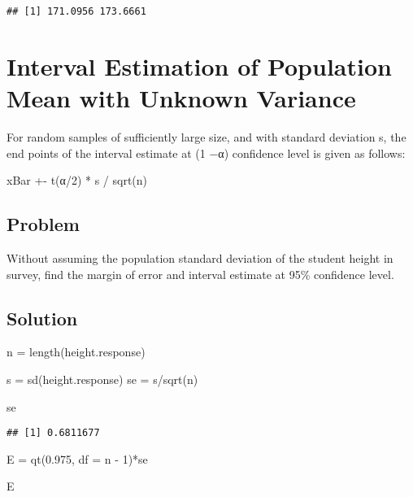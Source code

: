 \documentclass[
]{article}
\newenvironment{Shaded}{\begin{snugshade}}{\end{snugshade}}
\newcommand{\AttributeTok}[1]{\textcolor[rgb]{0.77,0.63,0.00}{#1}}
\newcommand{\DecValTok}[1]{\textcolor[rgb]{0.00,0.00,0.81}{#1}}
\newcommand{\FloatTok}[1]{\textcolor[rgb]{0.00,0.00,0.81}{#1}}
\newcommand{\FunctionTok}[1]{\textcolor[rgb]{0.00,0.00,0.00}{#1}}
\newcommand{\NormalTok}[1]{#1}
\newcommand{\OtherTok}[1]{\textcolor[rgb]{0.56,0.35,0.01}{#1}}
\newcommand{\SpecialCharTok}[1]{\textcolor[rgb]{0.00,0.00,0.00}{#1}}
\begin{document}
\begin{verbatim}
## [1] 171.0956 173.6661
\end{verbatim}

\hypertarget{interval-estimation-of-population-mean-with-unknown-variance}{%
\section{Interval Estimation of Population Mean with Unknown
Variance}\label{interval-estimation-of-population-mean-with-unknown-variance}}

For random samples of sufficiently large size, and with standard
deviation s, the end points of the interval estimate at (1 −α)
confidence level is given as follows:

xBar +- t(α/2) * s / sqrt(n)

\hypertarget{problem-6}{%
\subsection{Problem}\label{problem-6}}

Without assuming the population standard deviation of the student height
in survey, find the margin of error and interval estimate at 95\%
confidence level.

\hypertarget{solution-8}{%
\subsection{Solution}\label{solution-8}}

\begin{Shaded}
\begin{Highlighting}[]
\NormalTok{n }\OtherTok{=} \FunctionTok{length}\NormalTok{(height.response)}

\NormalTok{s }\OtherTok{=} \FunctionTok{sd}\NormalTok{(height.response)}
\NormalTok{se }\OtherTok{=}\NormalTok{ s}\SpecialCharTok{/}\FunctionTok{sqrt}\NormalTok{(n)}

\NormalTok{se}
\end{Highlighting}
\end{Shaded}

\begin{verbatim}
## [1] 0.6811677
\end{verbatim}

\begin{Shaded}
\begin{Highlighting}[]
\NormalTok{E }\OtherTok{=} \FunctionTok{qt}\NormalTok{(}\FloatTok{0.975}\NormalTok{, }\AttributeTok{df =}\NormalTok{ n }\SpecialCharTok{{-}} \DecValTok{1}\NormalTok{)}\SpecialCharTok{*}\NormalTok{se}

\NormalTok{E}
\end{Highlighting}
\end{Shaded}
\end{document}
